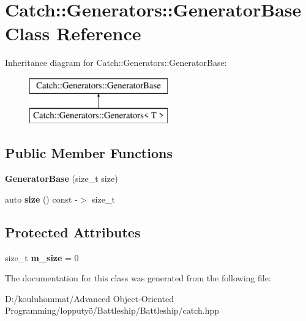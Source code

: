 \hypertarget{class_catch_1_1_generators_1_1_generator_base}{}\section{Catch\+:\+:Generators\+:\+:Generator\+Base Class Reference}
\label{class_catch_1_1_generators_1_1_generator_base}
Inheritance diagram for Catch\+:\+:Generators\+:\+:Generator\+Base\+:\begin{figure}[H]
\begin{center}
\leavevmode
\includegraphics[height=2.000000cm]{class_catch_1_1_generators_1_1_generator_base}
\end{center}
\end{figure}
\subsection*{Public Member Functions}
\begin{DoxyCompactItemize}
\item 
\mbox{\label{class_catch_1_1_generators_1_1_generator_base_ab003974d458a14acfb48f79e7e8abe21}} 
{\bfseries Generator\+Base} (size\+\_\+t size)
\item 
\mbox{\label{class_catch_1_1_generators_1_1_generator_base_a2fb4a5c153f3fdc2708245b40751b487}} 
auto {\bfseries size} () const -\/$>$ size\+\_\+t
\end{DoxyCompactItemize}
\subsection*{Protected Attributes}
\begin{DoxyCompactItemize}
\item 
\mbox{\label{class_catch_1_1_generators_1_1_generator_base_ac6ab90adfdda9401e2ea03db5b2dfc6a}} 
size\+\_\+t {\bfseries m\+\_\+size} = 0
\end{DoxyCompactItemize}


The documentation for this class was generated from the following file\+:\begin{DoxyCompactItemize}
\item 
D\+:/kouluhommat/\+Advanced Object-\/\+Oriented Programming/lopputyö/\+Battleship/\+Battleship/catch.\+hpp\end{DoxyCompactItemize}
